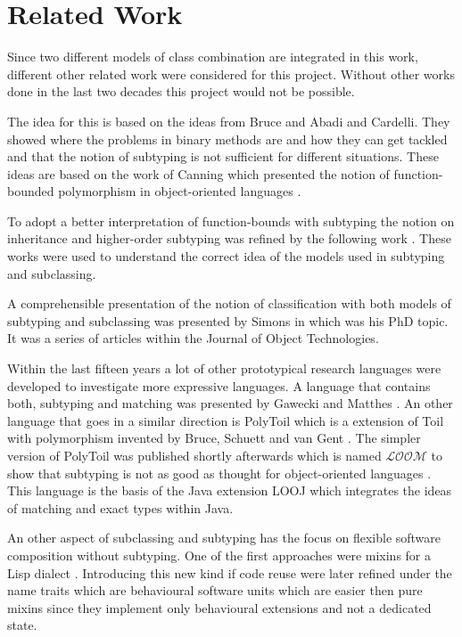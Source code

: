 \section{Related Work}
Since two different models of class combination are integrated in this
work, different other related work were considered for this project.
Without other works done in the last two decades this project would not
be possible.

The idea for this is based on the ideas from Bruce and Abadi and Cardelli.
They showed where the problems in binary methods are and how they
can get tackled and that the notion of subtyping is not sufficient for
different situations\cite{bruce_binary_1995,abadi_subtyping_1996}. These
ideas are based on the work of Canning which presented the notion
of function-bounded polymorphism in object-oriented languages
\cite{canning_f-bounded_1989}.

To adopt a better interpretation of function-bounds
with subtyping the notion on inheritance and
higher-order subtyping was refined by the following work
\cite{steffen_higher-order_1994,cook_inheritance_1990,taivalsaari_notion_1996}.
These works were used to understand the correct idea of the models used
in subtyping and subclassing.

A comprehensible presentation of the notion of classification with
both models of subtyping and subclassing was presented by Simons in
\cite{simons_theory_2002-2} which was his PhD topic. It was a series of
articles within the Journal of Object Technologies.

Within the last fifteen years a lot of other prototypical research
languages were developed to investigate more expressive languages. A
language that contains both, subtyping and matching was presented
by Gawecki and Matthes \cite{gawecki_tool:_1995}. An other language
that goes in a similar direction is PolyToil which is a extension
of Toil with polymorphism invented by Bruce, Schuett and van Gent
\cite{bruce_polytoil:_1995}. The simpler version of PolyToil was
published shortly afterwards which is named $\mathcal{LOOM}$ to show
that subtyping is not as good as thought for object-oriented languages
\cite{bruce_subtyping_1997}. This language is the basis of the Java
extension LOOJ which integrates the ideas of matching and exact types
within Java.

An other aspect of subclassing and subtyping has the focus
on flexible software composition without subtyping. One
of the first approaches were mixins for a Lisp dialect
\cite{bracha_mixin-based_1990}. Introducing this new kind if code reuse
were later refined under the name traits which are behavioural software
units \cite{schaerli_traits:_2003,ducasse_traits:_2006} which are easier
then pure mixins since they implement only behavioural extensions and
not a dedicated state.

